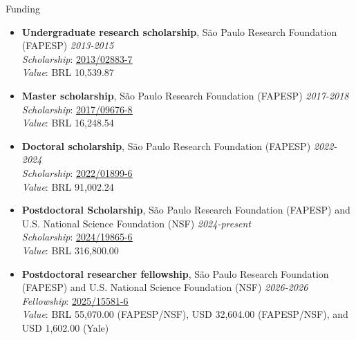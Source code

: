 \documentclass{resume}
\begin{document}
\begin{rSection}{Funding} 
\begin{itemize}
\item \textbf{Undergraduate research scholarship}{, São Paulo Research Foundation (FAPESP)
} \hfill{\em 2013-2015}\\
\textit{Scholarship}: \href{https://bv.fapesp.br/en/bolsas/142421/effect-of-fragmentation-on-the-persistence-of-anuran-amphibians-amphibia-anura-within-the-atlanti/}{\underline{2013/02883-7}}\\
\textit{Value}: BRL 10,539.87

\item \textbf{Master scholarship}{, São Paulo Research Foundation (FAPESP)
} \hfill{\em 2017-2018}\\
\textit{Scholarship}: \href{https://bv.fapesp.br/en/bolsas/172826/effect-of-landscape-modifications-and-climate-changes-on-the-persistence-of-amphibians-in-the-atlant/}{\underline{2017/09676-8}}\\
\textit{Value}: BRL 16,248.54

\item \textbf{Doctoral scholarship}{, São Paulo Research Foundation (FAPESP)
} \hfill{\em 2022-2024}\\
\textit{Scholarship}: \href{https://bv.fapesp.br/en/bolsas/203713/landscape-structure-as-a-predictor-of-taxonomic-and-functional-diversity-of-amphibians-in-the-atlant/}{\underline{2022/01899-6}}\\
\textit{Value}: BRL 91,002.24

\item \textbf{Postdoctoral Scholarship}{, São Paulo Research Foundation (FAPESP) and U.S. National Science Foundation (NSF)} \hfill{\em 2024-present}\\
\textit{Scholarship}: \href{https://bv.fapesp.br/en/bolsas/223203/impacts-of-edge-effects-fire-and-climate-change-on-vegetation-composition-and-functional-diversity-a/}{\underline{2024/19865-6}}\\
\textit{Value}: BRL 316,800.00

\item \textbf{Postdoctoral researcher fellowship}{, São Paulo Research Foundation (FAPESP) and U.S. National Science Foundation (NSF)
} \hfill{\em 2026-2026}\\
\textit{Fellowship}: \href{https://bv.fapesp.br/en/bolsas/230514/effects-of-habitat-degradation-on-inferring-the-local-dominance-of-tree-species-in-the-amazon-rainfo/}{\underline{2025/15581-6}}\\
\textit{Value}: BRL 55,070.00 (FAPESP/NSF), USD 32,604.00 (FAPESP/NSF), and USD 1,602.00 (Yale)
\end{itemize}
\end{rSection}
\end{document}
